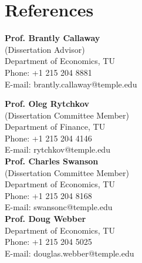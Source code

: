 \documentclass[12pt,letterpaper]{article}
\begin{document}
\section*{References}
\vspace{-.15in}
\begin{multicols}{2}
	
	\textbf{Prof. Brantly Callaway} \\
	(Dissertation Advisor)\\
	Department of Economics, TU \\
	\hfill {Phone: +1 215 204 8881}\\
	\hfill{E-mail: {\color{blue}brantly.callaway@temple.edu}}
	
	\vspace{.2in}
	
	\textbf{Prof. Oleg Rytchkov}\\
	(Dissertation Committee Member)\\
	Department of Finance, TU\\
	\hfill Phone: +1 215 204 4146\\
	\hfill{E-mail: {\color{blue}rytchkov@temple.edu}}\\

		\columnbreak
	\textbf{Prof. Charles Swanson} \\
		(Dissertation Committee Member)\\
	Department of Economics, TU \\
	\hfill {Phone: +1 215 204 8168}\\
	\hfill{E-mail: {\color{blue}swansonc@temple.edu}}\\

	\textbf{Prof. Doug Webber} \\
	Department of Economics, TU \\
	\hfill{Phone: +1 215 204 5025} \\
	\hfill{E-mail: {\color{blue}douglas.webber@temple.edu}}\\
	
%	
\end{multicols}
\end{document}
